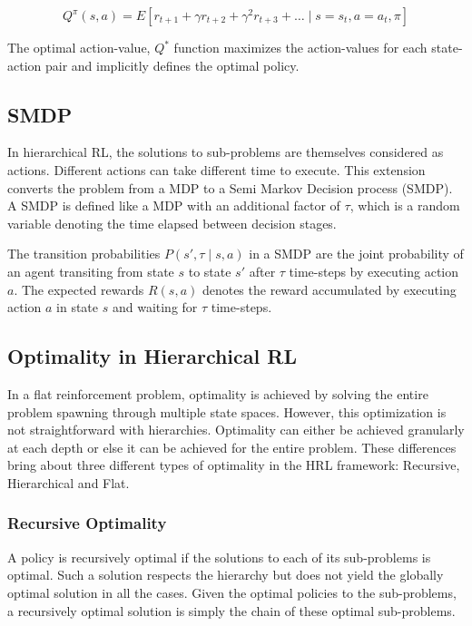 \begin{equation}
    Q^\pi (s, a)=E[r_{t+1}+\gamma r_{t+2}+ \gamma^2 r_{t+3} + \dots \mid s=s_t, a=a_t, \pi]
\end{equation}

The optimal action-value, \(Q^*\) function maximizes the action-values for each state-action pair and
implicitly defines the optimal policy.

\subsection*{SMDP}

In hierarchical RL, the solutions to sub-problems are themselves considered as actions.
Different actions can take different time to execute.
This extension converts the problem from a MDP to a Semi Markov Decision process (SMDP).
A SMDP is defined like a MDP with an additional factor of \(\tau\), which is
a random variable denoting the time elapsed between decision stages.

The transition probabilities \(P(s', \tau \mid s,a)\) in a SMDP are
the joint probability of an agent transiting from state \(s\) to state \(s'\)  after \(\tau\)
time-steps by executing action \(a\).
The expected rewards \(R(s,a)\) denotes the reward accumulated by executing action
\(a\) in state \(s\) and waiting for \(\tau\) time-steps.

\subsection*{Optimality in Hierarchical RL}

In a flat reinforcement problem, optimality is achieved by solving the entire problem spawning through multiple
state spaces. However, this optimization is not straightforward with hierarchies.
Optimality can either be achieved granularly at each depth or else it can be achieved for the entire problem.
These differences bring about three different types of optimality in the HRL framework: Recursive, Hierarchical and Flat.

\subsubsection*{Recursive Optimality}
A policy is recursively optimal if the solutions to each of its sub-problems is optimal.
Such a solution respects the hierarchy but does not yield the globally optimal solution in all the cases.
Given the optimal policies to the sub-problems, a recursively optimal solution is simply the chain of these optimal sub-problems.

